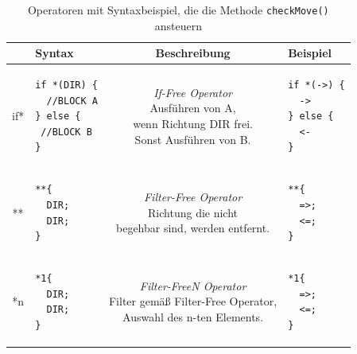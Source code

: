 \documentclass[conference]{IEEEtran}
\begin{document}
\begin{table}[!t]
\caption{Operatoren mit Syntaxbeispiel, die die Methode \texttt{checkMove()} ansteuern}
\label{checkmove_operators_tbl}
\centering
\setlength\tabcolsep{1.5pt}
\begin{tabular}{|c||l|c|l|}
\hline
& \textbf{Syntax} & \textbf{Beschreibung} & \textbf{Beispiel}\\

\hline
if* &

\begin{lstlisting}[basicstyle=\scriptsize\ttfamily]
if *(DIR) {
  //BLOCK A
} else {
 //BLOCK B
}
\end{lstlisting} &

\makecell{\textit{If-Free Operator}\\
Ausführen von A,\\
wenn Richtung DIR frei.\\
Sonst Ausführen von B.} &

\begin{lstlisting}[basicstyle=\scriptsize\ttfamily]
if *(->) {
  ->
} else {
  <-
}
\end{lstlisting} \\

\hline
** &

\begin{lstlisting}[basicstyle=\scriptsize\ttfamily]
**{
  DIR;
  DIR;
}
\end{lstlisting} &
\makecell{\textit{Filter-Free Operator}\\
Richtung die nicht\\
begehbar sind, werden entfernt.} &

\begin{lstlisting}[basicstyle=\scriptsize\ttfamily]
**{
  =>;
  <=;
}
\end{lstlisting} \\
\hline
*n &

\begin{lstlisting}[basicstyle=\scriptsize\ttfamily]
*1{
  DIR;
  DIR;
}
\end{lstlisting} &

\makecell{\textit{Filter-FreeN Operator}\\
Filter gemäß Filter-Free Operator,\\
Auswahl des n-ten Elements.} &

\begin{lstlisting}[basicstyle=\scriptsize\ttfamily]
 *1{
  =>;
  <=;
}
\end{lstlisting} \\
\hline

\end{tabular}
\end{table}
\end{document}
